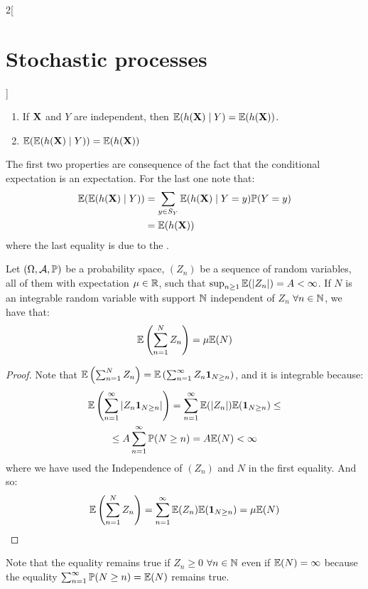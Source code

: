 \documentclass[../../../main_math.tex]{subfiles}
\begin{document}
\begin{multicols}{2}[\section{Stochastic processes}]
\begin{proposition}
\begin{enumerate}
      \item If $\boldsymbol{\mathrm{X}}$ and $Y$ are independent, then $\mathbb{E}(h(\boldsymbol{\mathrm{X}})\mid Y)=\mathbb{E}(h(\boldsymbol{\mathrm{X}}))$.
      \item $\mathbb{E}(\mathbb{E}(h(\boldsymbol{\mathrm{X}})\mid Y))=\mathbb{E}(h(\boldsymbol{\mathrm{X}}))$
    \end{enumerate}
  \end{proposition}
  \begin{sproof}
    The first two properties are consequence of the fact that the conditional expectation is an expectation. For the last one note that:
    \begin{align*}
      \mathbb{E}(\mathbb{E}(h(\boldsymbol{\mathrm{X}})\mid Y)) & =\sum_{y\in S_Y}\mathbb{E}(h(\boldsymbol{\mathrm{X}})\mid Y=y)\mathbb{P}(Y=y) \\
                                  & =\mathbb{E}(h(\boldsymbol{\mathrm{X}}))
    \end{align*}
    where the last equality is due to the .
  \end{sproof}
  \begin{theorem}
    Let $(\Omega,\mathcal{A},\mathbb{P})$ be a probability space, $(Z_n)$ be a sequence of random variables, all of them with expectation $\mu\in\mathbb{R}$, such that $\sup_{n\geq 1}\mathbb{E}(\abs{Z_n})=A<\infty$. If $N$ is an integrable random variable with support $\mathbb{N}$ independent of $Z_n$ $\forall n\in\mathbb{N}$, we have that:
    $$\mathbb{E}\left(\sum_{n=1}^NZ_n\right)=\mu\mathbb{E}(N)$$
  \end{theorem}
  \begin{proof}
    Note that $\mathbb{E}\left(\sum_{n=1}^NZ_n\right)=\mathbb{E}\left(\sum_{n=1}^\infty Z_n\boldsymbol{\mathrm{1}}_{N\geq n}\right)$, and it is integrable because:
    \begin{multline*}
      \mathbb{E}\left(\sum_{n=1}^\infty \abs{Z_n\boldsymbol{\mathrm{1}}_{N\geq n}}\right) =\sum_{n=1}^\infty \mathbb{E}(\abs{Z_n})\mathbb{E}(\boldsymbol{\mathrm{1}}_{N\geq n}) \leq              \\
      \leq A\sum_{n=1}^\infty \mathbb{P}(N\geq n) =A\mathbb{E}(N)<\infty
    \end{multline*}
    where we have used the Independence of $(Z_n)$ and $N$ in the first equality.
    And so:
    $$\mathbb{E}\left(\sum_{n=1}^NZ_n\right)=\sum_{n=1}^\infty \mathbb{E}(Z_n)\mathbb{E}(\boldsymbol{\mathrm{1}}_{N\geq n})=\mu\mathbb{E}(N)$$
  \end{proof}
  \begin{remark}
    Note that the equality remains true if $Z_n\geq 0$ $\forall n\in\mathbb{N}$ even if $\mathbb{E}(N)=\infty$ because the equality $\sum_{n=1}^\infty \mathbb{P}(N\geq n)=\mathbb{E}(N)$ remains true.
  \end{remark}

\end{multicols}
\end{document}
